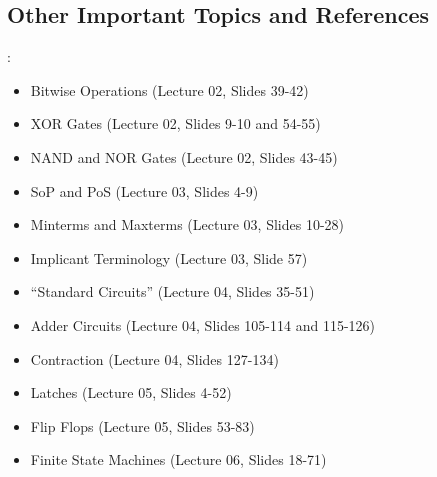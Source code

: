 \documentclass{../slides}
\begin{document}
\subsection{Other Important Topics and References}
\begin{frame}{\secname: \subsecname}
    \begin{itemize}
        \item Bitwise Operations (Lecture 02, Slides 39-42)
        \item XOR Gates (Lecture 02, Slides 9-10 and 54-55)
        \item NAND and NOR Gates (Lecture 02, Slides 43-45)
        \item SoP and PoS (Lecture 03, Slides 4-9)
        \item Minterms and Maxterms (Lecture 03, Slides 10-28)
        \item Implicant Terminology (Lecture 03, Slide 57)
        \item \enquote{Standard Circuits} (Lecture 04, Slides 35-51)
        \item Adder Circuits (Lecture 04, Slides 105-114 and 115-126)
        \item Contraction (Lecture 04, Slides 127-134)
        \item Latches (Lecture 05, Slides 4-52)
        \item Flip Flops (Lecture 05, Slides 53-83)
        \item Finite State Machines (Lecture 06, Slides 18-71)
    \end{itemize}
\end{frame}
\end{document}
